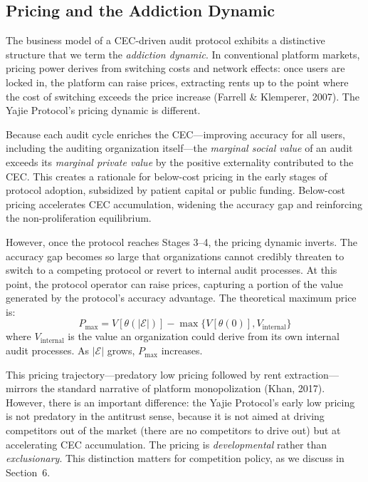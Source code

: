 \documentclass[12pt,a4paper]{article}
\theoremstyle{definition}
\theoremstyle{remark}
\begin{document}
\subsection{Pricing and the Addiction Dynamic}

The business model of a CEC-driven audit protocol exhibits a distinctive structure that we term the \textit{addiction dynamic}. In conventional platform markets, pricing power derives from switching costs and network effects: once users are locked in, the platform can raise prices, extracting rents up to the point where the cost of switching exceeds the price increase (Farrell \& Klemperer, 2007). The Yajie Protocol's pricing dynamic is different.

Because each audit cycle enriches the CEC—improving accuracy for all users, including the auditing organization itself—the \textit{marginal social value} of an audit exceeds its \textit{marginal private value} by the positive externality contributed to the CEC. This creates a rationale for below-cost pricing in the early stages of protocol adoption, subsidized by patient capital or public funding. Below-cost pricing accelerates CEC accumulation, widening the accuracy gap and reinforcing the non-proliferation equilibrium.

However, once the protocol reaches Stages 3–4, the pricing dynamic inverts. The accuracy gap becomes so large that organizations cannot credibly threaten to switch to a competing protocol or revert to internal audit processes. At this point, the protocol operator can raise prices, capturing a portion of the value generated by the protocol's accuracy advantage. The theoretical maximum price is:
\begin{equation}
P_{\max} = V[\theta(|\mathcal{E}|)] - \max\{V[\theta(0)], V_{\text{internal}}\}
\end{equation}
where $V_{\text{internal}}$ is the value an organization could derive from its own internal audit processes. As $|\mathcal{E}|$ grows, $P_{\max}$ increases.

This pricing trajectory—predatory low pricing followed by rent extraction—mirrors the standard narrative of platform monopolization (Khan, 2017). However, there is an important difference: the Yajie Protocol's early low pricing is not predatory in the antitrust sense, because it is not aimed at driving competitors out of the market (there are no competitors to drive out) but at accelerating CEC accumulation. The pricing is \textit{developmental} rather than \textit{exclusionary}. This distinction matters for competition policy, as we discuss in Section~6.
\end{document}
